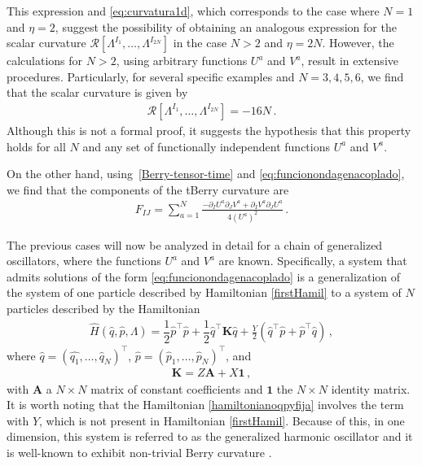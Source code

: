 \documentclass[12pt]{iopart}
\begin{document}
This expression and \eqref{eq:curvatura1d}, which corresponds to the case where $N=1$ and $\eta=2$, suggest the possibility of obtaining an analogous expression for the scalar curvature $\mathcal{R}[\Lambda^{I_1},\dots,\Lambda^{I_{2N}}]$ in the case $N>2$ and $\eta=2N$. However, the calculations for $N>2$, using arbitrary functions $U^a$ and $V^a$, result in extensive procedures. Particularly, for several specific examples and $N=3,4,5,6$, we find that the scalar curvature is given by 
\begin{align}
\label{escalar16n}
    \mathcal{R}[\Lambda^{I_1},\dots,\Lambda^{I_{2N}}]=-16N\,.
\end{align}
Although this is not a formal proof, it suggests the hypothesis that this property holds for all $N$ and any set of functionally independent functions $U^a$ and $V^a$.


On the other hand, using~\eqref{Berry-tensor-time} and \eqref{eq:funcionondagenacoplado}, we find that the components of the tBerry curvature are
\begin{align}
F_{IJ}=\sum_{a=1}^N \frac{-\partial_{I}U^a\partial_{J}V^a+\partial_{I}V^a\partial_{J}U^a}{4(U^{a})^2} \,.
\end{align}


The previous cases will now be analyzed in detail for a chain of generalized oscillators, where the functions $U^a$ and $V^a$ are known. Specifically, a system that admits solutions of the form \eqref{eq:funcionondagenacoplado} is a generalization of the system of one particle described by Hamiltonian \eqref{firstHamil} to a system of $N$ particles described by the Hamiltonian
\begin{align} 
\label{hamiltonianoqpyfija}
\hat{H}( \hat{q},\hat{p}, \Lambda)=\dfrac{1}{2} \hat{p}^{\intercal} \hat{p}+\dfrac{1}{2} \hat{q}^{\intercal} \boldsymbol{K} \hat{q} +\frac{Y}{2} \left( \hat{q}^{\intercal} \hat{p} +\hat{p}^{\intercal} \hat{q} \right)\,,
\end{align}
where $\hat{q}=(\hat{q_1},\dots,\hat{q}_N)^{\intercal}$, $\hat{p}=(\hat{p}_1,\dots,\hat{p}_N)^{\intercal}$, and
\begin{align}
\boldsymbol{K}= Z \boldsymbol{A}+X\boldsymbol{1} \,, 
\end{align}  
with $\boldsymbol{A}$ a $N \times N$ matrix of constant coefficients and $\boldsymbol{1}$ the $N \times N$ identity matrix. It is worth noting that the Hamiltonian \eqref{hamiltonianoqpyfija} involves the term with $Y$, which is not present in Hamiltonian \eqref{firstHamil}. Because of this, in one dimension, this system is referred to as the generalized harmonic oscillator and it is well-known to exhibit non-trivial Berry curvature \cite{chruscinski}.
\end{document}
